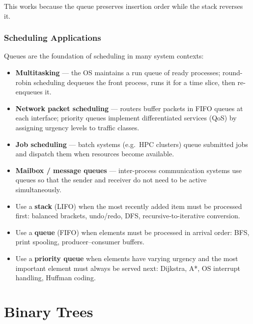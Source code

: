 \documentclass[11pt, a4paper, notitlepage]{report}
\theoremstyle{definition}
\theoremstyle{remark}
\theoremstyle{definition}
\begin{document}
This works because the queue preserves insertion order while the stack reverses it.

\subsection{Scheduling Applications}
\label{subsec:scheduling}

Queues are the foundation of scheduling in many system contexts:
\begin{itemize}
  \item \textbf{Multitasking} --- the OS maintains a run queue of ready processes; round-robin
        scheduling dequeues the front process, runs it for a time slice, then re-enqueues it.
  \item \textbf{Network packet scheduling} --- routers buffer packets in FIFO queues at each
        interface; priority queues implement differentiated services (QoS) by assigning urgency
        levels to traffic classes.
  \item \textbf{Job scheduling} --- batch systems (e.g.\ HPC clusters) queue submitted jobs
        and dispatch them when resources become available.
  \item \textbf{Mailbox / message queues} --- inter-process communication systems use queues
        so that the sender and receiver do not need to be active simultaneously.
\end{itemize}

\begin{examtip}[title={Exam Tip: Choosing Between Stack, Queue, and Priority Queue}]
\begin{itemize}
  \item Use a \textbf{stack} (LIFO) when the most recently added item must be processed
        first: balanced brackets, undo/redo, DFS, recursive-to-iterative conversion.
  \item Use a \textbf{queue} (FIFO) when elements must be processed in arrival order:
        BFS, print spooling, producer--consumer buffers.
  \item Use a \textbf{priority queue} when elements have varying urgency and the most
        important element must always be served next: Dijkstra, A*, OS interrupt handling,
        Huffman coding.
\end{itemize}
\end{examtip}

\chapter{Binary Trees}
\label{ch:binary-trees}
\end{document}
